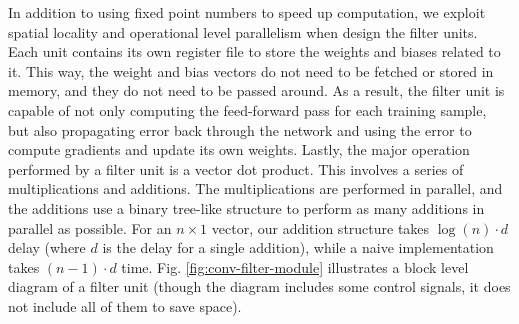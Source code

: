 In addition to using fixed point numbers to speed up computation, we exploit spatial locality and operational level parallelism when design the filter units. Each unit contains its own register file to store the weights and biases related to it. This way, the weight and bias vectors do not need to be fetched or stored in memory, and they do not need to be passed around. As a result, the filter unit is capable of not only computing the feed-forward pass for each training sample, but also propagating error back through the network and using the error to compute gradients and update its own weights. Lastly, the major operation performed by a filter unit is a vector dot product. This involves a series of multiplications and additions. The multiplications are performed in parallel, and the additions use a binary tree-like structure to perform as many additions in parallel as possible. For an $n \times 1$ vector, our addition structure takes $\log(n) \cdot d$ delay (where $d$ is the delay for a single addition), while a naive implementation takes $(n - 1) \cdot d$ time. Fig. \ref{fig:conv-filter-module} illustrates a block level diagram of a filter unit (though the diagram includes some control signals, it does not include all of them to save space).

